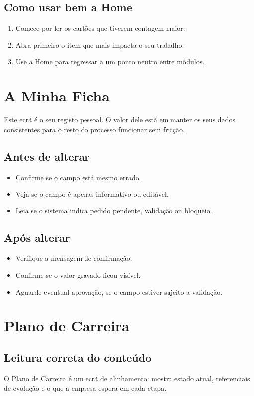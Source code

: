 \subsection{Como usar bem a Home}
\begin{enumerate}
  \item Comece por ler os cartões que tiverem contagem maior.
  \item Abra primeiro o item que mais impacta o seu trabalho.
  \item Use a Home para regressar a um ponto neutro entre módulos.
\end{enumerate}

\section{A Minha Ficha}
Este ecrã é o seu registo pessoal. O valor dele está em manter os seus dados consistentes para o resto do processo funcionar sem fricção.

\subsection{Antes de alterar}
\begin{itemize}
  \item Confirme se o campo está mesmo errado.
  \item Veja se o campo é apenas informativo ou editável.
  \item Leia se o sistema indica pedido pendente, validação ou bloqueio.
\end{itemize}

\subsection{Após alterar}
\begin{itemize}
  \item Verifique a mensagem de confirmação.
  \item Confirme se o valor gravado ficou visível.
  \item Aguarde eventual aprovação, se o campo estiver sujeito a validação.
\end{itemize}

\section{Plano de Carreira}
\subsection{Leitura correta do conteúdo}
O Plano de Carreira é um ecrã de alinhamento: mostra estado atual, referenciais de evolução e o que a empresa espera em cada etapa.


